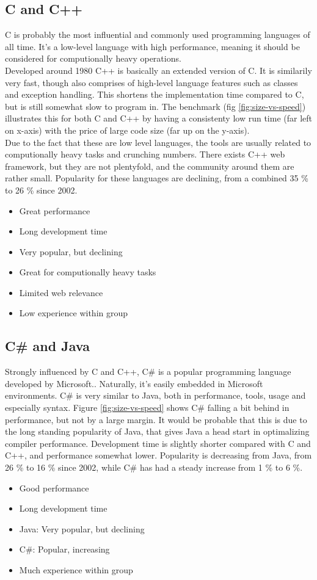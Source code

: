\documentclass{report}
\begin{document}
\subsection{C and C++}
C is probably the most influential and commonly used programming languages of all time\cite{website:proglang_popularity}\cite{website:proglang_popularity_2}. It's a low-level language with high performance, meaning it should be considered for computionally heavy operations. \\
Developed around 1980\cite{reference} C++ is basically an extended version of C. It is similarily very fast, though also comprises of high-level language features such as classes and exception handling. This shortens the implementation time compared to C, but is still somewhat slow to program in. The benchmark (fig \ref{fig:size-vs-speed}) illustrates this for both C and C++ by having a consistenty low run time (far left on x-axis) with the price of large code size (far up on the y-axis). \\
Due to the fact that these are low level languages, the tools are usually related to computionally heavy tasks and crunching numbers. There exists C++ web framework, but they are not plentyfold, and the community around them are rather small. Popularity for these languages are declining, from a combined 35 \% to 26 \% since 2002.
\begin{itemize}
\item Great performance
\item Long development time
\item Very popular, but declining
\item Great for computionally heavy tasks
\item Limited web relevance 
\item Low experience within group
\end{itemize}
\subsection{C\# and Java}
Strongly influenced by C and C++, C\# is a popular programming language developed by Microsoft.\cite{reference}. Naturally, it's easily embedded in Microsoft environments. C\# is very similar to Java, both in performance, tools, usage and especially syntax. Figure \ref{fig:size-vs-speed} shows C\# falling a bit behind in performance, but not by a large margin. It would be probable that this is due to the long standing popularity of Java, that gives Java a head start in optimalizing compiler performance. Development time is slightly shorter compared with C and C++, and performance somewhat lower. Popularity is decreasing from Java, from 26 \% to 16 \% since 2002, while C\# has had a steady increase from 1 \% to 6 \%. 
\begin{itemize}
\item Good performance
\item Long development time
\item Java: Very popular, but declining
\item C\#: Popular, increasing
\item Much experience within group
\end{itemize}
\end{document}

